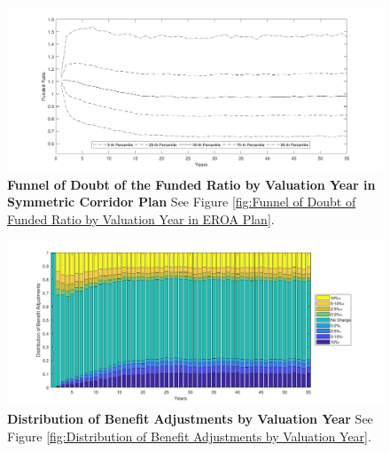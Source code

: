 \documentclass{sfuthesis}
\numberwithin{equation}{chapter}
\begin{document}
		\begin{figure}[H]
			\includegraphics[width=1\linewidth]{ResultPlot/FR2.pdf} 
			\caption[Funnel of Doubt of the Funded Ratio by Valuation Year in Symmetric Corridor Plan]{\textbf{Funnel of Doubt of the Funded Ratio by Valuation Year in Symmetric Corridor Plan}
			\vspace{-0.4cm}
			\newline\footnotesize\justify See Figure \ref{fig:Funnel of Doubt of Funded Ratio by Valuation Year in EROA Plan}.}
			\label{fig:Funnel of Doubt of the Funded Ratio by Valuation Year in Symmetric Corridor Plan}	
		\end{figure}
		
		\begin{figure}[H]
			\includegraphics[width=1\linewidth]{ResultPlot/ProbIncDc2.pdf} 
			\caption[Distribution of Benefit Adjustments by Valuation Year]{\textbf{Distribution of Benefit Adjustments by Valuation Year}
			\vspace{-0.4cm}
			\newline\footnotesize\justify See Figure \ref{fig:Distribution of Benefit Adjustments by Valuation Year}.}
			\label{fig:Distribution of Benefit Adjustments by Valuation Year 3}
		\end{figure}
\end{document}
